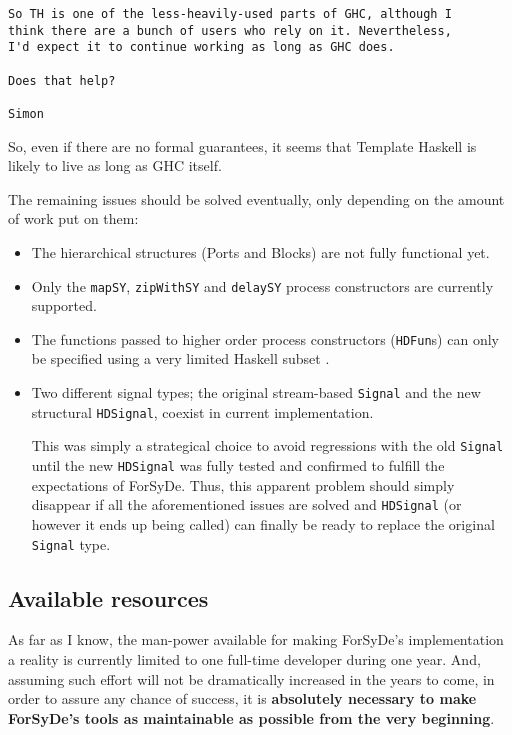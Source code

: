 \documentclass[a4paper,twoside,11pt]{article}
\begin{document}
\begin{itemize}
\begin{verbatim}
So TH is one of the less-heavily-used parts of GHC, although I 
think there are a bunch of users who rely on it. Nevertheless, 
I'd expect it to continue working as long as GHC does.

Does that help?

Simon
\end{verbatim}

So, even if there are no formal guarantees, it seems that Template
Haskell is likely to live as long as GHC itself.

\end{itemize}

The remaining issues should be solved eventually, only depending on the amount
of work put on them:

\begin{itemize}
\item The hierarchical structures (Ports and Blocks) are not fully functional
  yet.
\item Only the \texttt{mapSY}, \texttt{zipWithSY} and \texttt{delaySY} process
  constructors are currently supported.

\item The functions passed to higher order process constructors
  (\texttt{HDFun}s) can only be specified using a very limited Haskell subset
  \cite[section 3.4.2]{forsyde:synthesis} .

\item Two different signal types; the original stream-based \texttt{Signal}
  and the new structural \texttt{HDSignal}, coexist in current implementation.

  This was simply a strategical choice to avoid regressions with the old
  \texttt{Signal} until the new \texttt{HDSignal} was fully tested and
  confirmed to fulfill the expectations of ForSyDe. Thus, this apparent
  problem should simply disappear if all the aforementioned issues are solved
  and \texttt{HDSignal} (or however it ends up being called) can finally be
  ready to replace the original \texttt{Signal} type.
\end{itemize}

\subsection{Available resources}

As far as I know, the man-power available for making ForSyDe's implementation
a reality is currently limited to one full-time developer during one
year. And, assuming such effort will not be dramatically increased in the
years to come, in order to assure any chance of success, it is
\textbf{absolutely necessary to make ForSyDe's tools as maintainable as
  possible from the very beginning}.
\end{document}
